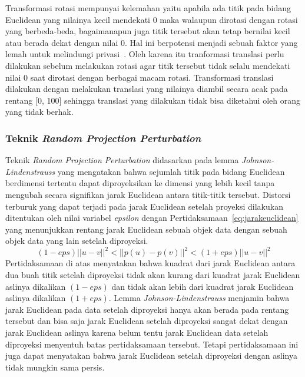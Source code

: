 Transformasi rotasi mempunyai kelemahan yaitu apabila ada titik pada bidang Euclidean yang nilainya kecil mendekati 0 maka walaupun dirotasi dengan rotasi yang berbeda-beda, bagaimanapun juga titik tersebut akan tetap bernilai kecil atau berada dekat dengan nilai 0. Hal ini berpotensi menjadi sebuah faktor yang lemah untuk melindungi privasi~\cite{rotation:05:chenliu}. Oleh karena itu tranformasi translasi perlu dilakukan sebelum melakukan rotasi agar titik tersebut tidak selalu mendekati nilai 0 saat dirotasi dengan berbagai macam rotasi. Transformasi translasi dilakukan dengan melakukan translasi yang nilainya diambil secara acak pada rentang [0, 100] sehingga translasi yang dilakukan tidak bisa diketahui oleh orang yang tidak berhak.

\subsubsection{Teknik \textit{Random Projection Perturbation}}
\label{subsubsec:analisis-projection}

Teknik \textit{Random Projection Perturbation} didasarkan pada lemma \textit{Johnson-Lindenstrauss} yang mengatakan bahwa sejumlah titik pada bidang Euclidean berdimensi tertentu dapat diproyeksikan ke dimensi yang lebih kecil tanpa mengubah secara signifikan jarak Euclidean antara titik-titik tersebut. Distorsi terburuk yang dapat terjadi pada jarak Euclidean setelah proyeksi dilakukan ditentukan oleh nilai variabel \textit{epsilon} dengan Pertidaksamaan~\ref{eq:jarakeuclidean} yang menunjukkan rentang jarak Euclidean sebuah objek data dengan sebuah objek data yang lain setelah diproyeksi.
\begin{equation}\label{eq:jarakeuclidean}
	(1-eps)||u - v||^{2}<||p(u) - p(v)||^{2}<(1+eps)||u - v||^{2}
\end{equation}
Pertidaksamaan di atas menyatakan bahwa kuadrat dari jarak Euclidean antara dua buah titik setelah diproyeksi tidak akan kurang dari kuadrat jarak Euclidean aslinya dikalikan \((1-eps)\) dan tidak akan lebih dari kuadrat jarak Euclidean aslinya dikalikan \((1+eps)\). Lemma \textit{Johnson-Lindenstrauss} menjamin bahwa jarak Euclidean pada data setelah diproyeksi hanya akan berada pada rentang tersebut dan bisa saja jarak Euclidean setelah diproyeksi sangat dekat dengan jarak Euclidean aslinya karena belum tentu jarak Euclidean data setelah diproyeksi menyentuh batas pertidaksamaan tersebut. Tetapi pertidaksamaan ini juga dapat menyatakan bahwa jarak Euclidean setelah diproyeksi dengan aslinya tidak mungkin sama persis.


